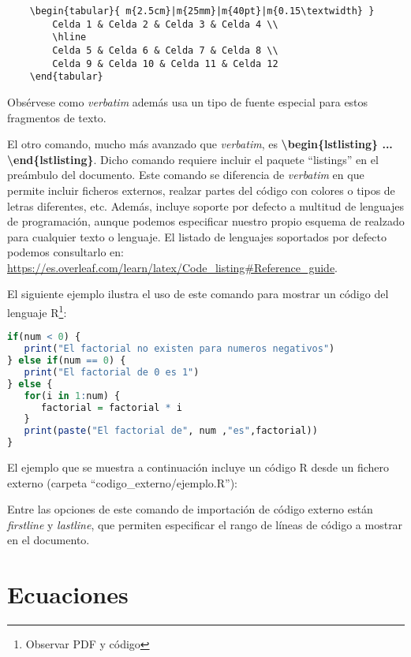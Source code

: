 \begin{verbatim}
	\begin{tabular}{ m{2.5cm}|m{25mm}|m{40pt}|m{0.15\textwidth} }
 		Celda 1 & Celda 2 & Celda 3 & Celda 4 \\
 		\hline
 		Celda 5 & Celda 6 & Celda 7 & Celda 8 \\  
 		Celda 9 & Celda 10 & Celda 11 & Celda 12   
	\end{tabular}
\end{verbatim}

Obsérvese como \emph{verbatim} además usa un tipo de fuente especial para estos fragmentos de texto.

El otro comando, mucho más avanzado que \emph{verbatim}, es \textbf{\textbackslash begin\{lstlisting\} ... \textbackslash end\{lstlisting\}}. Dicho comando requiere incluir el paquete ``listings'' en el preámbulo del documento. Este comando se diferencia de \emph{verbatim} en que permite incluir ficheros externos, realzar partes del código con colores o tipos de letras diferentes, etc. Además, incluye soporte por defecto a multitud de lenguajes de programación, aunque podemos especificar nuestro propio esquema de realzado para cualquier texto o lenguaje. El listado de lenguajes soportados por defecto podemos consultarlo en: \url{https://es.overleaf.com/learn/latex/Code_listing#Reference_guide}.

El siguiente ejemplo ilustra el uso de este comando para mostrar un código del lenguaje R\footnote{Observar PDF y código}:

\begin{lstlisting}[language=R]
if(num < 0) {
   print("El factorial no existen para numeros negativos")
} else if(num == 0) {
   print("El factorial de 0 es 1")
} else {
   for(i in 1:num) {
      factorial = factorial * i
   }
   print(paste("El factorial de", num ,"es",factorial))
}
\end{lstlisting}

El ejemplo que se muestra a continuación incluye un código R desde un fichero externo (carpeta ``codigo\_externo/ejemplo.R''):



Entre las opciones de este comando de importación de código externo están \emph{firstline} y \emph{lastline}, que permiten especificar el rango de líneas de código a mostrar en el documento.
	
\section{Ecuaciones}

